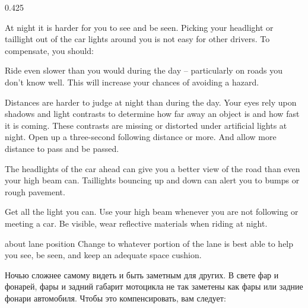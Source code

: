 


\begin{langblock}{0.425}
	\begin{eng}
	
	At night it is harder for you to see and be seen. Picking your headlight or taillight out of the car lights around you is not easy for other drivers. To compensate, you should:
	
	\begin{description} [noitemsep]
		\item[Reduce Your Speed] Ride even slower than you would during the day -- particularly on roads you don't know well. This will increase your chances of avoiding a hazard.
		\item[Increase Distance] Distances are harder to judge at night than during the day. Your eyes rely upon shadows and light contrasts to determine how far away an object is and how fast it is coming. These contrasts are missing or distorted under artificial lights at night. Open up a three-second following distance or more. And allow more distance to pass and be passed.
		\item[Use the Car Ahead] The headlights of the car ahead can give you a better view of the road than even your high beam can. Taillights bouncing up and down can alert you to bumps or rough pavement.
		\item[Use Your High Beam] Get all the light you can. Use your high beam whenever you are not following or meeting a car. Be visible, wear reflective materials when riding at night.
		\item[Be flexible] about lane position Change to whatever portion of the lane is best able to help you see, be seen, and keep an adequate space cushion.
	\end{description}
	\end{eng}
	\begin{rus}
		
		Ночью сложнее самому видеть и быть заметным для других. В свете фар и фонарей, фары и задний габарит мотоцикла не так заметены как фары или задние фонари автомобиля. Чтобы это компенсировать, вам следует:
		

\end{rus}
\end{langblock}
